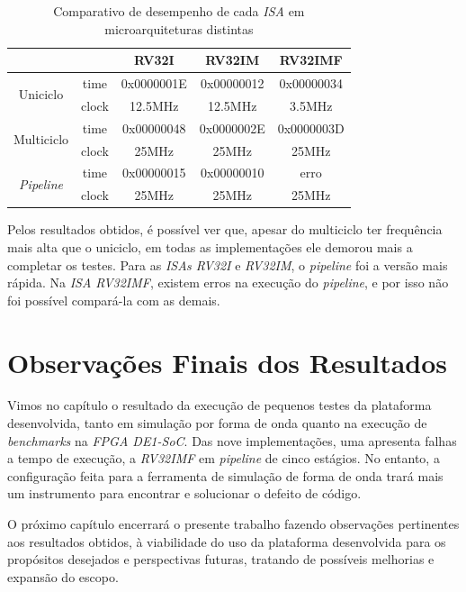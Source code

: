     \begin{longtable}{cc|c|c|c|}
        \caption{Comparativo de desempenho de cada \textit{ISA} em microarquiteturas distintas}\label{table:benchmark}\\
        \cline{3-5}
                                                                &                               & RV32I       & RV32IM      & RV32IMF   \\
        \hline
        \endfirsthead
        \endhead
        \multicolumn{1}{|c}{\multirow{2}{*}{{Uniciclo}}}        & \multicolumn{1}{|c|}{time}    & 0x0000001E  & 0x00000012  & 0x00000034 \\
        \cline{2-5}
        \multicolumn{1}{|c}{ }                                  & \multicolumn{1}{|c|}{clock}   & 12.5MHz     & 12.5MHz     & 3.5MHz \\
        \hline
        \multicolumn{1}{|c}{\multirow{2}{*}{{Multiciclo}}}      & \multicolumn{1}{|c|}{time}    & 0x00000048  & 0x0000002E  & 0x0000003D \\
        \cline{2-5}
        \multicolumn{1}{|c}{ }                                  & \multicolumn{1}{|c|}{clock}   & 25MHz       & 25MHz       & 25MHz \\
        \hline
        \multicolumn{1}{|c}{\multirow{2}{*}{\textit{Pipeline}}} & \multicolumn{1}{|c|}{time}    & 0x00000015  & 0x00000010  & erro \\
        \cline{2-5}
        \multicolumn{1}{|c}{ }                                  & \multicolumn{1}{|c|}{clock}   & 25MHz       & 25MHz       & 25MHz \\
        \hline
    \end{longtable}

    { Pelos resultados obtidos, é possível ver que, apesar do multiciclo ter
        frequência mais alta que o uniciclo, em todas as implementações ele demorou
        mais a completar os testes. Para as \textit{ISAs RV32I} e \textit{RV32IM},
        o \textit{pipeline} foi a versão mais rápida. Na \textit{ISA RV32IMF},
        existem erros na execução do \textit{pipeline}, e por isso não foi possível
        compará-la com as demais.
    }

\section{Observações Finais dos Resultados}
    { Vimos no capítulo o resultado da execução de pequenos testes da plataforma
        desenvolvida, tanto em simulação por forma de onda quanto na execução de
        \textit{benchmarks} na \textit{FPGA DE1-SoC}. Das nove implementações,
        uma apresenta falhas a tempo de execução, a \textit{RV32IMF} em
        \textit{pipeline} de cinco estágios. No entanto, a configuração feita para
        a ferramenta de simulação de forma de onda trará mais um instrumento para
        encontrar e solucionar o defeito de código.
    }

    { O próximo capítulo encerrará o presente trabalho fazendo observações
        pertinentes aos resultados obtidos, à viabilidade do uso da plataforma
        desenvolvida para os propósitos desejados e perspectivas futuras,
        tratando de possíveis melhorias e expansão do escopo.
    }

